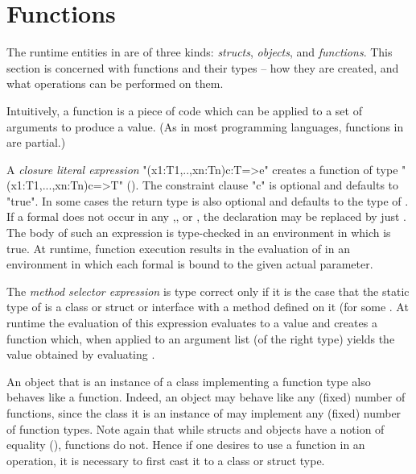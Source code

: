 \section{Functions}
\label{Functions}
\label{functions}

The runtime entities in \Xten{} are of three kinds: \emph{structs},
\emph{objects}, and \emph{functions}. This section is concerned with
functions and their types -- how they are created, and what operations
can be performed on them.

Intuitively, a function is a piece of code which can be applied to a
set of arguments to produce a value. (As in most programming
languages, functions in \Xten{} are partial.)

A \emph{closure literal expression} 
\xcd"(x1:T1,..,xn:Tn){c}:T=>e"
creates a function of type \xcd"(x1:T1,...,xn:Tn){c}=>T" (). The constraint
clause \xcd"{c}" is optional and defaults to \xcd"{true}". In some cases the
return type  is also optional and defaults to the type of . If a
formal  does not occur in any ,, or , the declaration  may be
replaced by just . The body  of such an expression is type-checked
in an environment in which  is true. At runtime, function execution
results in the evaluation of  in an environment in which each formal
is bound to the given actual parameter.

The \emph{method selector expression}  is type
correct only if it is the case that the static type of  is a
class or struct or interface with a method
 defined on it (for some
. At runtime the evaluation of this expression
evaluates  to a value  and creates a function 
which, when applied to an argument list  (of the right
type) yields the value obtained by evaluating .


An object  that is an instance of a class implementing a function
type  also behaves like a function. Indeed, an
object may behave like any (fixed) number of functions, since the
class it is an instance of may implement any (fixed) number of
function types. Note again that while structs and objects have a
notion of equality (\Xcd{==}), functions do not. Hence if one desires to use
a function  in an \Xcd{==} operation, it is necessary to first cast it to a
class or struct type.


  
%


